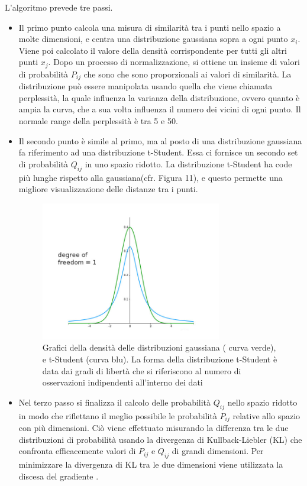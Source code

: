 \documentclass[12pt,italian]{report}
\begin{document}
L'algoritmo prevede tre passi.
\begin{itemize}
	\item Il primo punto calcola una misura di similarità tra i punti nello spazio a molte dimensioni, e centra una distribuzione gaussiana sopra a ogni punto $x_i$. Viene poi calcolato il valore della densità corrispondente per tutti gli altri punti $x_j$. Dopo un processo di normalizzazione, si ottiene un insieme di valori di probabilità $P_{ij}$ che sono che sono proporzionali ai valori di similarità. La distribuzione può essere manipolata usando quella che viene chiamata perplessità, la quale influenza la varianza della distribuzione, ovvero quanto è ampia la curva, che a sua volta influenza  il numero dei vicini di ogni punto. Il normale range della perplessità è tra 5 e 50.
	\item Il secondo punto è simile al primo, ma al posto di una distribuzione gaussiana fa riferimento ad una distribuzione t-Student. Essa ci fornisce un secondo set di probabilità $Q_{ij}$ in uno spazio ridotto. La distribuzione t-Student ha code più lunghe rispetto alla gaussiana(cfr. Figura 11), e questo permette una migliore visualizzazione delle distanze tra i punti.
	
	\begin{figure}[h]
		\centering
		\includegraphics[width = 79mm]{immagini/t-dist1}
		\caption{Grafici della densità delle distribuzioni gaussiana ( curva verde), e t-Student (curva blu). La forma della distribuzione t-Student è data dai gradi di libertà che si riferiscono al numero di osservazioni indipendenti all'interno dei dati}
	\end{figure}
	\item Nel terzo passo si finalizza il calcolo delle probabilità $Q_{ij}$ nello spazio ridotto in modo che riflettano il meglio possibile le probabilità $P_{ij}$ relative allo spazio con più dimensioni. Ciò viene effettuato misurando la differenza tra le due distribuzioni di probabilità usando la divergenza di Kullback-Liebler (KL) che confronta efficacemente valori di $P_{ij}$ e $Q_{ij}$ di grandi dimensioni. Per minimizzare la divergenza di KL tra le due dimensioni viene utilizzata la discesa del gradiente \cite{t-SNE}.
\end{itemize}
\end{document}
